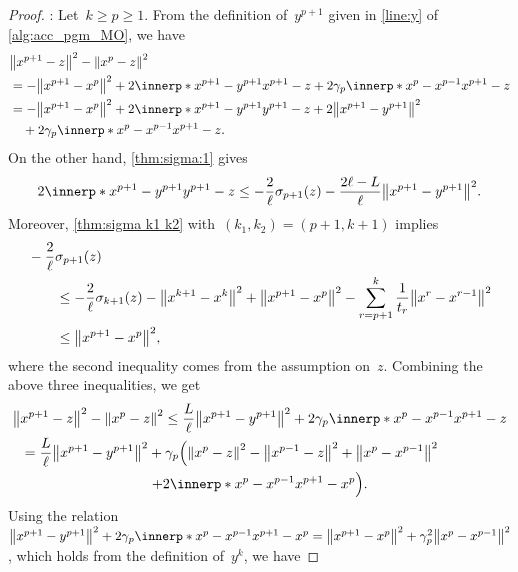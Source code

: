 \documentclass[../main]{subfiles}
\begin{document}
\begin{proof}
    :
    Let~$k \ge p \ge 1$.
    From the definition of~$y^{p + 1}$ given in \cref{line:y} of \cref{alg:acc_pgm_MO}, we have
    \[
        \begin{split}
            &\norm*{x^{p + 1} - z}^2 - \norm*{x^p - z}^2 \\
        &= - \norm*{x^{p + 1} - x^p}^2 + 2 \innerp*{x^{p + 1} - y^{p + 1}}{x^{p + 1} - z} + 2 \gamma_p \innerp*{x^p - x^{p - 1}}{x^{p + 1} - z} \\
        &= - \norm*{x^{p + 1} - x^p}^2 + 2 \innerp*{x^{p + 1} - y^{p + 1}}{y^{p + 1} - z} + 2 \norm*{x^{p + 1} - y^{p + 1}}^2 \\
        &\quad + 2 \gamma_p \innerp*{x^p - x^{p - 1}}{x^{p + 1} - z}
     .   \end{split}
    \]
    On the other hand, \cref{thm:sigma:1} gives
    \[
        2 \innerp*{x^{p + 1} - y^{p + 1}}{y^{p + 1} - z} \le - \frac{2}{\ell} \sigma_{p + 1}(z) - \frac{2 \ell - L}{\ell} \norm*{x^{p + 1} - y^{p + 1}}^2
    .\]
    Moreover, \cref{thm:sigma k1 k2} with~$(k_1, k_2) = (p + 1, k + 1)$ implies
    \[
        \begin{split}
            \MoveEqLeft
        - \frac{2}{\ell} \sigma_{p + 1}(z) \\
        &\le - \frac{2}{\ell} \sigma_{k + 1}(z) - \norm*{x^{k + 1} - x^k}^2 + \norm*{x^{p + 1} - x^p}^2 - \sum_{r = p + 1}^{k} \frac{1}{t_r}\norm*{x^r - x^{r - 1}}^2 \\
        &\le \norm*{x^{p + 1} - x^p}^2
        ,\end{split}
    \]
    where the second inequality comes from the assumption on~$z$.
    Combining the above three inequalities, we get
    \begin{multline}
        \norm*{x^{p + 1} - z}^2 - \norm*{x^p - z}^2 \le \frac{L}{\ell} \norm*{x^{p + 1} - y^{p + 1}}^2 + 2 \gamma_p \innerp*{x^p - x^{p - 1}}{x^{p + 1} - z} \\
        \shoveleft = \frac{L}{\ell} \norm*{x^{p + 1} - y^{p + 1}}^2
        + \gamma_p \Bigl( \norm*{x^p - z}^2 - \norm*{x^{p - 1} - z}^2 + \norm*{x^p - x^{p - 1}}^2 \\
    + 2 \innerp*{x^p - x^{p - 1}}{x^{p + 1} - x^p} \Bigr)
    .\end{multline}
    Using the relation~$\norm*{x^{p + 1} - y^{p + 1}}^2 + 2 \gamma_p \innerp*{x^p - x^{p - 1}}{x^{p + 1} - x^p} = \norm*{x^{p + 1} - x^p}^2 + \gamma_p^2 \norm*{x^p - x^{p - 1}}^2$, which holds from the definition of~$y^k$, we have

\end{proof}
\end{document}
